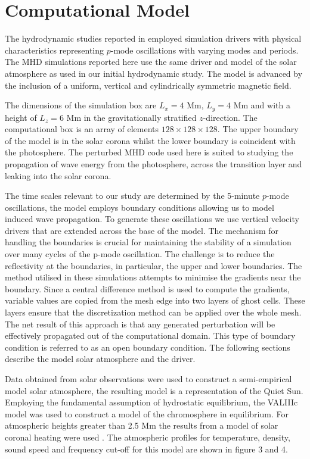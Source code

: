 \documentclass[physics,article,submit,pdftex,moreauthors]{Definitions/mdpi}
\begin{document}
\section{Computational Model}
The hydrodynamic studies reported in  \cite{Griffiths2018b} employed simulation drivers with physical characteristics representing $p$-mode oscillations with varying modes and periods. The MHD simulations reported here use the same driver and model of the solar atmosphere as used in our initial hydrodynamic study. The model is  advanced by the inclusion of a uniform, vertical and cylindrically symmetric magnetic field. 

 The dimensions of the simulation box are $L_{ x}= 4$ Mm,  $L_{y} =4$ Mm and with a height of $L_{z} =6$ Mm in the gravitationally stratified $z$-direction. The computational box is an array of elements $128 \times128 \times128 $. The upper boundary of the model is in the solar corona whilst the lower boundary is coincident with the photosphere. The perturbed MHD code used here is suited to studying the propagation of wave energy from the photosphere, across the transition layer and leaking into the solar corona. 
 
The time scales relevant to our study are determined by the 5-minute $p$-mode oscillations, the model employs boundary conditions allowing us to model induced wave propagation. To generate these oscillations we use vertical velocity drivers  that are extended across the base of the model. The mechanism for handling the boundaries is crucial for maintaining the stability of a simulation over many cycles of the p-mode oscillation. The challenge is to reduce the reflectivity at the boundaries, in particular, the upper and lower boundaries. The method utilised in these simulations attempts to minimise the gradients near the boundary. Since a central difference method is used to compute the gradients, variable values are copied from the mesh edge into two layers of ghost cells. These layers ensure that the discretization method can be applied over the whole mesh. The net result of this approach is that any generated perturbation will be effectively propagated out of the computational domain. This type of boundary condition is referred to as an open boundary condition. The following sections describe the model solar atmosphere and the driver.

Data obtained from solar observations were used to construct a semi-empirical model solar atmosphere, the resulting model is a representation of the Quiet Sun. Employing the fundamental assumption of hydrostatic equilibrium, the VALIIIc model \cite{Vernazza1981} was used to construct a model of the chromosphere in equilibrium. For atmospheric heights greater than 2.5 Mm the results from a model of solar coronal heating were used \cite{McWhirter1975}. The atmospheric profiles for temperature, density, sound speed and frequency cut-off for this model are shown in figure 3 and 4.
\end{document}
